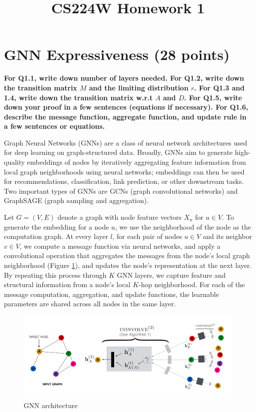 \documentclass{article}
\title{CS224W Homework 1}
\numberwithin{figure}{section}
\begin{document}
	
	\maketitle
	
	\section{GNN Expressiveness (28 points)}
	
	
	\textbf{For Q1.1, write down number of layers needed. For Q1.2, write down the transition matrix $M$ and the limiting distribution $r$. For Q1.3 and 1.4, write down the transition matrix w.r.t $A$ and $D$. For Q1.5, write down your proof in a few sentences (equations if necessary). For Q1.6, describe the message function, aggregate function, and update rule in a few sentences or equations.}
	
	Graph Neural Networks (GNNs) are a class of neural network architectures used for deep learning on graph-structured data. Broadly, GNNs aim to generate high-quality embeddings of nodes by iteratively aggregating feature information from local graph neighborhoods using neural networks; embeddings can then be used for recommendations, classification, link prediction, or other downstream tasks. Two important types of GNNs are GCNs (graph convolutional networks) and GraphSAGE (graph sampling and aggregation).
	
	Let $G = (V,E)$ denote a graph with node feature vectors $X_u$ for $u \in V$. To generate the embedding for a node $u$, we use the neighborhood of the node as the computation graph. At every layer $l$, for each pair of nodes $u \in V$ and its neighbor $v \in V$, we compute a message function via neural networks, and apply a convolutional operation that aggregates the messages from the node’s local graph neighborhood (Figure \ref{fig:Q4-gnn-architecture}), and updates the node’s representation at the next layer. By repeating this process through $K$ GNN layers, we capture feature and structural information from a node’s local $K$-hop neighborhood. For each of the message computation, aggregation, and update functions, the learnable parameters are shared across all nodes in the same layer.
	
	\begin{figure}[!htb]
		\centering
		\includegraphics[width=0.7\columnwidth]{gnn-architecture.png}
		\caption{GNN architecture}   
		\label{fig:Q4-gnn-architecture}
	\end{figure}
	
\end{document}
